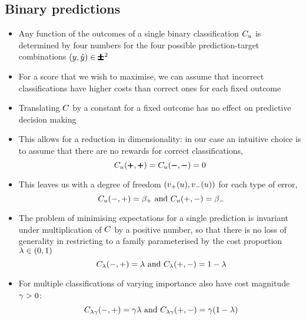\documentclass{article}
\begin{document}
        \subsection{Binary predictions}
  \begin{itemize}
        \item
          Any function of the outcomes of a single binary classification $\SCORE_\Usr$ is determined by four numbers for the four possible prediction-target combinations $({y},{\hat{y}})\in\pmb{\pmb\pm}^2$
        \item
          For a score that we wish to maximise, we can assume that incorrect classifications have higher costs than correct ones for each fixed outcome
        \item
          Translating ${C}$ by a constant for a fixed outcome has no effect on predictive decision making
        \item
          This allows for a reduction in dimensionality: in our case an intuitive choice is to assume that there are no rewards for correct classifications,
          $$
          \REST[\SCORE][\Usr](\POS,\POS)=\REST[\SCORE][\Usr](\NEG,\NEG)=0
          $$
        \item
          This leaves us with a degree of freedom $\COSTPN[(u)]$ for each type of error,
          $$
          ~\REST[\SCORE][\Usr](-,+)=\wfp\text{ and }\REST[\SCORE][\Usr](+,-)=\wfn
          $$

        \item
          The problem of minimising expectations for a single prediction is invariant under multiplication of ${C}$ by a positive number, so that there is no loss of generality in restricting to a family parameterised by the cost proportion ${{\lambda}}\in(0,1)$
          $$
          ~\REST[\SCORE][\LCOST](-,+)=\LCOST\text{ and }\REST[\SCORE][\LCOST](+,-)=1-\LCOST
          $$
        \item
          For multiple classifications of varying importance also have cost magnitude ${{\gamma}}>0$:
          $$
          ~\REST[\SCORE][\LCOST\COSTMAG](-,+)=\COSTMAG\LCOST\text{ and }\REST[\SCORE][\LCOST\COSTMAG](+,-)=\COSTMAG(1-\LCOST)
          $$


\end{itemize}
\end{document}
